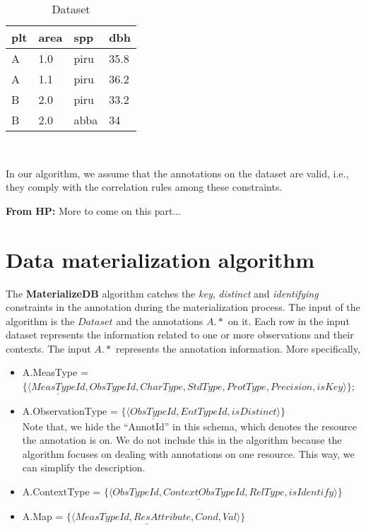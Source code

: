 \documentclass[10pt]{article}
\begin{document}
\begin{table}[htb]
\begin{center}
\begin{tabular}{|l|l|l|l|}
\hline
plt & area & spp & dbh\\\hline
A & 1.0 & piru & 35.8 \\\hline
A & 1.1 & piru & 36.2 \\\hline
B & 2.0 &piru &33.2 \\\hline
B& 2.0 & abba&34\\\hline
\end{tabular}\\
\end{center}
\vspace{-0.2in}
\caption{Dataset}
\label{tb:pltarea}
\end{table}

In our algorithm, we assume that the annotations on the dataset are valid, i.e., they comply with the correlation rules among these constraints. 

{\bf From HP:} More to come on this part...

\section{Data materialization algorithm}
The {\bf MaterializeDB} algorithm catches the {\em key}, {\em distinct} and {\em identifying} constraints in the annotation during the materialization process. 
The input of the algorithm is the $Dataset$ and the annotations $A.*$ on it. 
Each row in the input dataset represents the information related to one or more observations and their contexts.
The input $A.*$ represents the annotation information.
More specifically,
\begin{itemize}
\item A.MeasType = $\{\langle \underline{MeasTypeId}, ObsTypeId, CharType, StdType, ProtType, Precision, isKey \rangle\}$;
\item A.ObservationType = $\{\langle \underline{ObsTypeId}, EntTypeId, isDistinct \rangle\}$ \\
	Note that, we hide the ``AnnotId'' in this schema, which denotes the resource the annotation is on.
    We do not include this in the algorithm because the algorithm focuses on dealing with annotations on one resource.
    This way, we can simplify the description.
\item A.ContextType = $\{\langle \underline{ObsTypeId, ContextObsTypeId, RelType}, isIdentify\rangle\}$
\item A.Map = $\{\langle \underline{MeasTypeId, ResAttribute, Cond}, Val\rangle\}$
\end{itemize}
\end{document}
